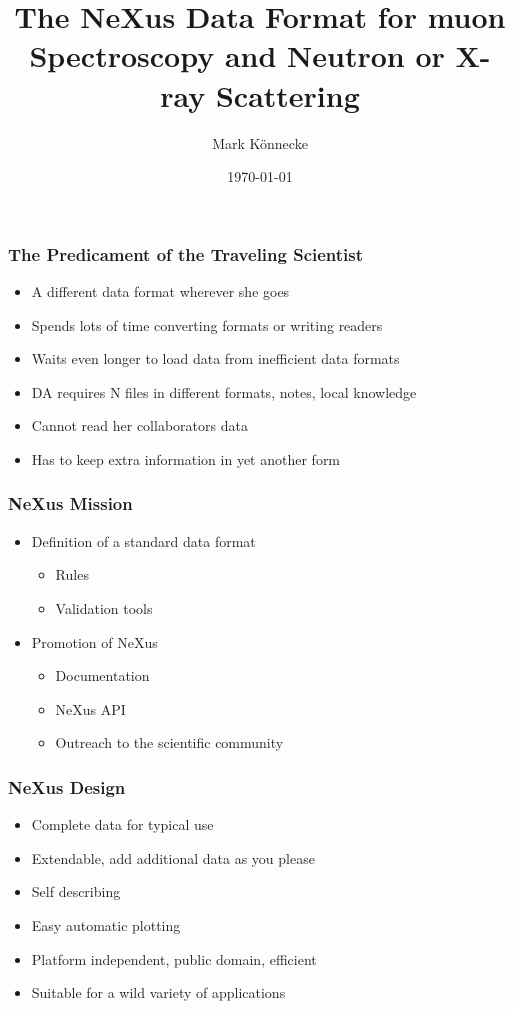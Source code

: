 \documentclass{beamer}
\title{The NeXus Data Format for muon Spectroscopy and Neutron or X-ray Scattering }
\author{Mark K\"onnecke }
\institute{Paul Scherrer Institute\\Switzerland }
\date{\today}
\begin{document}
\begin{frame}
\titlepage
\end{frame}

\begin{frame}
\frametitle{The Predicament of the Traveling Scientist}
\begin{itemize}
\item<1->A different data format wherever she goes
\item<2->Spends lots of time converting formats or writing readers
\item<3->Waits even longer to load data from inefficient data formats
\item<4->DA requires N files in different  formats, notes, local knowledge 
\item<5->Cannot read her collaborators data
\item<6->Has to keep extra information in yet another form
\end{itemize}
\end{frame}

\begin{frame} \frametitle{NeXus Mission}
\begin{itemize}
\item Definition of a standard data format
\begin{itemize}
\item Rules
\item Validation tools
\end{itemize}
\item Promotion of NeXus
\begin{itemize}
\item Documentation
\item NeXus API
\item Outreach to the scientific community
\end{itemize}
\end{itemize}
\end{frame}


\begin{frame} \frametitle{NeXus Design}
\begin{itemize}
\item Complete data for typical use
\item Extendable, add additional data as you please
\item Self describing
\item Easy automatic plotting
\item Platform independent, public domain, efficient
\item Suitable for a wild variety of applications
\end{itemize}
\end{frame}
\end{document}
